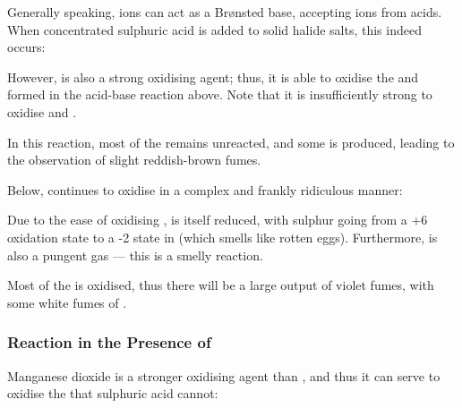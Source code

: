 			Generally speaking,  ions can act as a Brønsted base, accepting  ions from acids. When concentrated sulphuric acid
			is added to solid halide salts, this indeed occurs:


			However,  is also a strong oxidising agent; thus, it is able to oxidise the  and  formed in the acid-base
			reaction above. Note that it is insufficiently strong to oxidise  and .



			In this reaction, most of the  remains unreacted, and some  is produced, leading to the observation of
			slight reddish-brown fumes.


			Below,  continues to oxidise  in a complex and frankly ridiculous manner:



			Due to the ease of oxidising ,  is itself reduced, with sulphur going from a +6 oxidation state to a -2 state
			in  (which smells like rotten eggs). Furthermore,  is also a pungent gas --- this is
			a smelly reaction.

			Most of the  is oxidised, thus there will be a large output of violet fumes, with some white fumes of .


			\pagebreak
			\subsubsection{Reaction in the Presence of \texorpdfstring{}{MnO₂}}

				Manganese dioxide is a stronger oxidising agent than , and thus it can serve to oxidise the  that sulphuric
				acid cannot:


